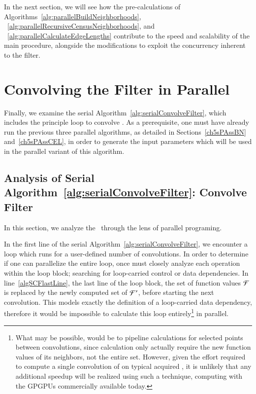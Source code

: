 In the next section, we will see how the pre-calculations of Algorithms~\ref{alg:parallelBuildNeighborhoods}, ~\ref{alg:parallelRecursiveCensusNeighborhoods}, and ~\ref{alg:parallelCalculateEdgeLengths} contribute to the speed and scalability of the main procedure, alongside the modifications to exploit the concurrency inherent to the filter.

%
%
%
%
\section{Convolving the Filter in Parallel}
\label{ch6sCFP}
Finally, we examine the serial Algorithm~\ref{alg:serialConvolveFilter}, which includes the principle loop to convolve . As a prerequisite, one must have already run the previous three parallel algorithms, as detailed in Sections~\ref{ch5sPAssBN} and~\ref{ch5sPAssCEL}, in order to generate the input parameters which will be used in the parallel variant of this algorithm.

%
%
\subsection{Analysis of Serial Algorithm~\ref{alg:serialConvolveFilter}: Convolve Filter}
\label{ch6sCFPssASACF}
In this section, we analyze the~ through the lens of parallel programing.

In the first line of the serial Algorithm~\ref{alg:serialConvolveFilter}, we encounter a loop which runs for a user-defined number of convolutions. In order to determine if one can parallelize the entire loop, once must closely analyze each operation within the loop block; searching for loop-carried control or data dependencies. In line~\ref{algSCFlastLine}, the last line of the loop block, the set of function values $\mathcal{F}$ is replaced by the newly computed set of  $\mathcal{F}'$, before starting the next convolution. This models exactly the definition of a loop-carried data dependency, therefore it would be impossible to calculate this loop entirely\footnote{What may be possible, would be to pipeline calculations for selected points between convolutions, since calculation only actually require the new function values of its neighbors, not the entire set. However, given the effort required to compute a single convolution of  on typical acquired \tdd{}, it is unlikely that any additional speedup will be realized using such a technique, computing with the GPGPUs commercially available today.} in parallel.

